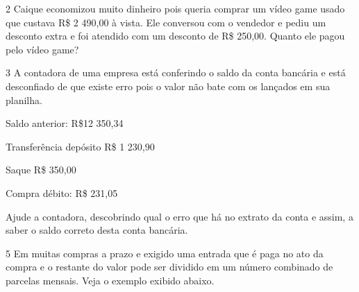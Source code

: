 

\num{2} Caique economizou muito dinheiro pois queria comprar um vídeo game
usado que custava R\$ 2 490,00 à vista. Ele conversou com o vendedor e
pediu um desconto extra e foi atendido com um desconto de R\$ 250,00.
Quanto ele pagou pelo vídeo game?



\num{3} A contadora de uma empresa está conferindo o saldo da conta
bancária e está desconfiado de que existe erro pois o valor não bate com
os lançados em sua planilha.


Saldo anterior: R\$12 350,34

Transferência depósito R\$ 1 230,90

Saque R\$ 350,00

Compra débito: R\$ 231,05

Ajude a contadora, descobrindo qual o erro que há no extrato da conta e
assim, a saber o saldo correto desta conta bancária.



\num{5} Em muitas compras a prazo e exigido uma entrada que é paga no ato
da compra e o restante do valor pode ser dividido em um número combinado
de parcelas mensais. Veja o exemplo exibido abaixo.


